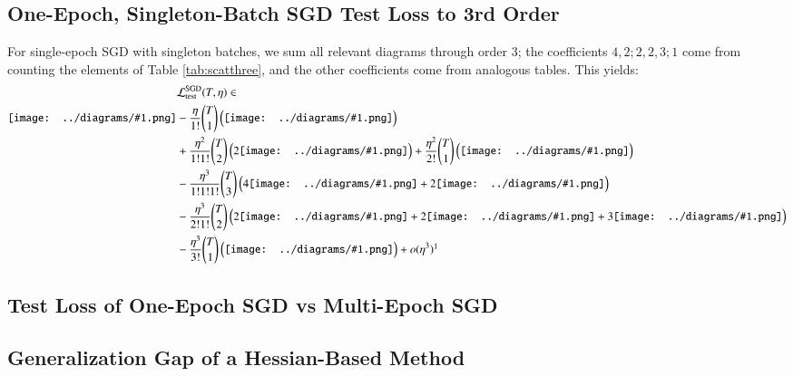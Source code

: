 \documentclass{article}
\newcommand{\wrap}[1]{\left( #1 \right)}
\newcommand{\sdia}[1]{\begin{gathered}\texttt{[image: ../diagrams/\#1.png]}\end{gathered}}
\begin{document}
    \subsection*{One-Epoch, Singleton-Batch SGD Test Loss to 3rd Order}
        For single-epoch SGD with singleton batches, we sum all relevant diagrams
        through order $3$; the coefficients $4, 2; 2, 2, 3; 1$ come from counting
        the elements of Table \ref{tab:scatthree}, and the other coefficients come
        from analogous tables.  This yields:
        \begin{align*}
                &\mathcal{L}^{\text{SGD}}_\text{test}(T, \eta) \in                   
            \\ 
                   \sdia{(0)()}
                &- \frac{\eta}{1!}   {T \choose 1} \wrap{\sdia{(0-1)(01)}}
            \\
                &+ \frac{\eta^2}{1!1!} {T \choose 2} \wrap{2 \sdia{(0-1-2)(01-12)}} 
                 + \frac{\eta^2}{2!} {T \choose 1} \wrap{\sdia{(01-2)(02-12)}}
            \\
                &- \frac{\eta^3}{1!1!1!} {T \choose 3} \wrap{
                           4 \sdia{(0-1-2-3)(01-12-23)}+
                           2 \sdia{(0-1-2-3)(03-13-23)}
                       }
            \\
                &- \frac{\eta^3}{2!1!} {T \choose 2} \wrap{
                           2         \sdia{(01-2-3)(03-12-23)}+
                           2    \sdia{(0-12-3)(02-13-23)}+
                           3     \sdia{(01-2-3)(02-12-23)}
                       }
            \\
                &- \frac{\eta^3}{3!} {T \choose 1} \wrap{\sdia{(012-3)(03-13-23)}}
                + o(\eta^3)\footnotemark
        \end{align*}

    \subsection*{Test Loss of One-Epoch SGD vs Multi-Epoch SGD}

    \subsection*{Generalization Gap of a Hessian-Based Method}
\end{document}

